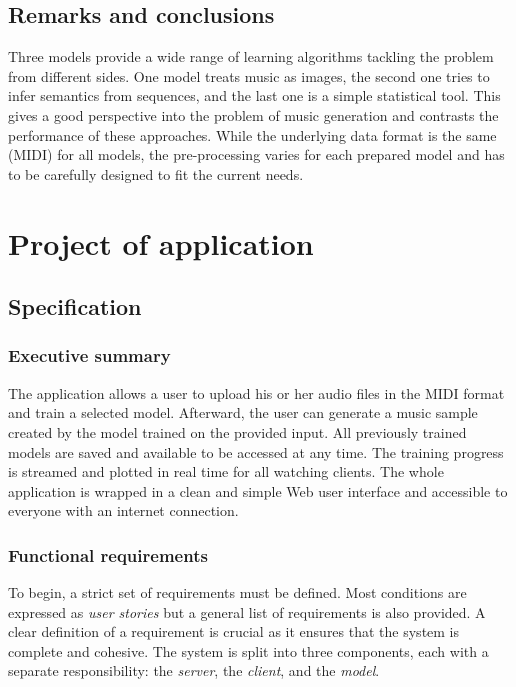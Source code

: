 \documentclass[a4paper, 11pt, twoside]{report}
\theoremstyle{definition}
\begin{document}
\section{Remarks and conclusions}

Three models provide a wide range of learning algorithms tackling the problem from different sides. One model treats music as images, the second one tries to infer semantics from sequences, and the last one is a simple statistical tool. This gives a good perspective into the problem of music generation and contrasts the performance of these approaches. While the underlying data format is the same (MIDI) for all models, the pre-processing varies for each prepared model and has to be carefully designed to fit the current needs. \par



\chapter{Project of application}


\section{Specification}

\subsection{Executive summary}

The application allows a user to upload his or her audio files in the MIDI format and train a selected model. Afterward, the user can generate a music sample created by the model trained on the provided input. All previously trained models are saved and available to be accessed at any time. The training progress is streamed and plotted in real time for all watching clients. The whole application is wrapped in a clean and simple Web user interface and accessible to everyone with an internet connection. \par

\subsection{Functional requirements}

To begin, a strict set of requirements must be defined. Most conditions are expressed as \textit{user stories} but a general list of requirements is also provided. A clear definition of a requirement is crucial as it ensures that the system is complete and cohesive. The system is split into three components, each with a separate responsibility: the \textit{server}, the \textit{client}, and the \textit{model}. \par
\end{document}
